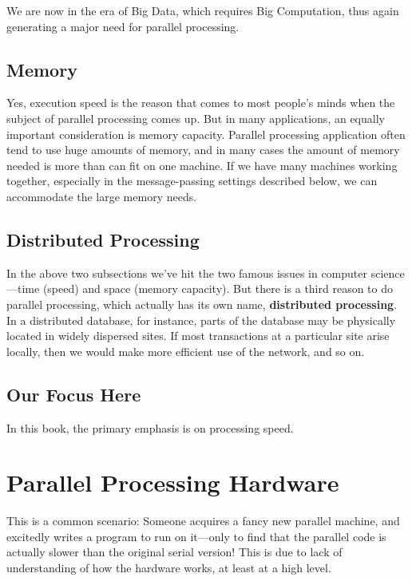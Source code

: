 We are now in the era of Big Data, which requires Big Computation, thus
again generating a major need for parallel processing.

\subsection{Memory}

Yes, execution speed is the reason that comes to most people's minds
when the subject of parallel processing comes up.  But in many
applications, an equally important consideration is memory capacity.
Parallel processing application often tend to use huge amounts of
memory, and in many cases the amount of memory needed is more than can
fit on one machine.  If we have many machines working together,
especially in the message-passing settings described below, we can
accommodate the large memory needs.

\subsection{Distributed Processing}

In the above two subsections we've hit the two famous issues in computer
science---time (speed) and space (memory capacity).  But there is a
third reason to do parallel processing, which actually has its own name,
{\bf distributed processing}.  In a distributed database, for instance,
parts of the database may be physically located in widely dispersed
sites.  If most transactions at a particular site arise locally, then
we would make more efficient use of the network, and so on.

\subsection{Our Focus Here}

In this book, the primary emphasis is on processing speed.

\section{Parallel Processing Hardware}

This is a common scenario:  Someone acquires a fancy new parallel
machine, and excitedly writes a program to run on it---only to find that
the parallel code is actually slower than the original serial version!
This is due to lack of understanding of how the hardware works, at least
at a high level.

